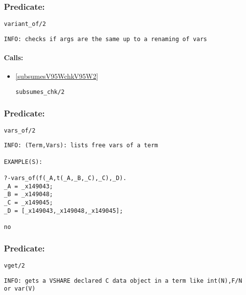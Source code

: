\subsubsection{Predicate:} \label{variantV95WofV95W2}

\begin{verbatim}
variant_of/2
\end{verbatim}

{\small \begin{verbatim}
INFO: checks if args are the same up to a renaming of vars

\end{verbatim}}
\paragraph{Calls:} 
\begin{itemize}
\item \ref{subsumesV95WchkV95W2} 
\begin{verbatim}
subsumes_chk/2
\end{verbatim}

\end{itemize}

\subsubsection{Predicate:} \label{varsV95WofV95W2}

\begin{verbatim}
vars_of/2
\end{verbatim}

{\small \begin{verbatim}
INFO: (Term,Vars): lists free vars of a term

EXAMPLE(S):

?-vars_of(f(_A,t(_A,_B,_C),_C),_D).
_A = _x149043;
_B = _x149048;
_C = _x149045;
_D = [_x149043,_x149048,_x149045];

no

\end{verbatim}}

\subsubsection{Predicate:} \label{vgetV95W2}

\begin{verbatim}
vget/2
\end{verbatim}

{\small \begin{verbatim}
INFO: gets a VSHARE declared C data object in a term like int(N),F/N or var(V)

\end{verbatim}}
